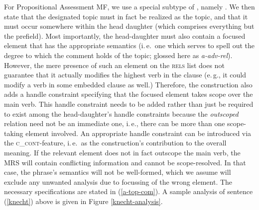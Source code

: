 \begin{exe}
\begin{xlist}[iv.]
\begin{exe}
\begin{xlist}[iv.]
\begin{exe}
\begin{xlist}[iv.]
For Propositional Assessment MF, we use a special subtype of , namely
. We then state that the designated topic must in fact be realized as the
topic, and that it must occur somewhere within the head daughter (which comprises everything but the
prefield). Most importantly, the head-daughter must also contain a focused element that has the
appropriate semantics (i.\,e.\ one which serves to spell out the degree to which the comment holds
of the topic; glossed here as \textit{a-adv-rel}). However, the mere presence of such an element on
the \textsc{rels} list does not guarantee that it actually modifies the highest verb in the clause
(e.\,g., it could modify a verb in some embedded clause as well.) Therefore, the construction also
adds a handle constraint specifying that the focused element takes scope over the main verb. This
handle constraint needs to be added rather than just be required to exist among the head-daughter's
handle constraints because the \textit{outscoped} relation need not be an immediate one, i.\,e.,
there can be more than one scope-taking element involved. An appropriate handle constraint can be
introduced via the \textsc{c\_cont}-feature, i.\,e.\ as the construction's contribution to the overall
meaning. If the relevant element does not in fact outscope the main verb, the MRS will contain
conflicting information and cannot be scope-resolved. In that case, the phrase's semantics will not
be well-formed, which we assume will exclude any unwanted analysis due to focussing of the wrong
element. The necessary specifications are stated in (\ref{a-top-com}). A sample analysis of sentence
(\ref{knecht}) above is given in Figure \ref{knecht-analysis}.



\end{xlist}
\end{exe}
\end{xlist}
\end{exe}
\end{xlist}
\end{exe}
